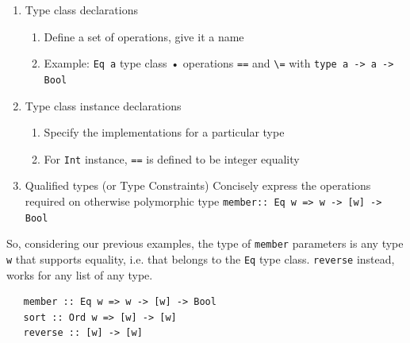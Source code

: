 \begin{enumerate}
   \item Type class declarations
   \begin{enumerate}
      \item Define a set of operations, give it a name
      \item Example: \lstinline|Eq a| type class
      • operations \lstinline|==| and \lstinline|\=| with \lstinline|type a -> a -> Bool|
   \end{enumerate}
   \item Type class instance declarations
   \begin{enumerate}
      \item Specify the implementations for a particular type
      \item For \lstinline|Int| instance, \lstinline|==| is defined to be integer equality
   \end{enumerate}
   \item Qualified types (or Type Constraints)
   Concisely express the operations required on otherwise polymorphic type
   \lstinline|member:: Eq w => w -> [w] -> Bool|
\end{enumerate}

So, considering our previous examples, the type of \lstinline|member| parameters is any type \lstinline|w| that supports equality, i.e. that belongs to the \lstinline|Eq| type class.
\lstinline|reverse| instead, works for any list of any type.
\begin{lstlisting}
   member :: Eq w => w -> [w] -> Bool
   sort :: Ord w => [w] -> [w]
   reverse :: [w] -> [w]
\end{lstlisting}


